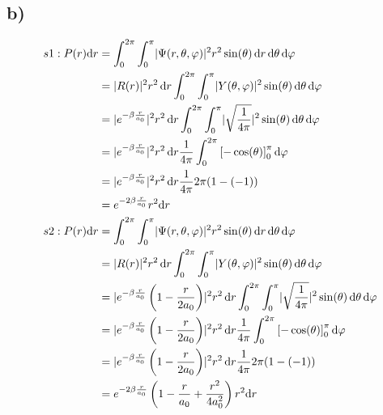     \subsection{b)}

    \begin{align*}
        s1: P(r)\mathrm{d}r &= \int_{0}^{2\pi} \int_{0}^{\pi} \lvert\Psi(r,\theta,\varphi)\rvert^2 r^2 \sin(\theta)\, \mathrm{d}r\, \mathrm{d}\theta\, \mathrm{d}\varphi\\
        &= \lvert R(r)\rvert^2 r^2 \,\mathrm{d}r \int_{0}^{2\pi} \int_{0}^{\pi} \lvert Y(\theta,\varphi)\rvert^2 \sin(\theta) \, \mathrm{d}\theta\, \mathrm{d}\varphi\\
        &= \lvert e^{-\beta\frac{r}{a_0}}\rvert^2 r^2 \,\mathrm{d}r \int_{0}^{2\pi} \int_{0}^{\pi} \lvert\sqrt{\frac{1}{4\pi}}\rvert^2 \sin(\theta) \, \mathrm{d}\theta\, \mathrm{d}\varphi\\
        &= \lvert e^{-\beta\frac{r}{a_0}}\rvert^2 r^2 \,\mathrm{d}r \frac{1}{4\pi} \int_{0}^{2\pi} \left[-\cos(\theta)\right]_0^{\pi} \mathrm{d}\varphi\\
        &= \lvert e^{-\beta\frac{r}{a_0}}\rvert^2 r^2 \,\mathrm{d}r \frac{1}{4\pi} 2\pi (1-(-1))\\
        &= e^{-2\beta\frac{r}{a_0}} r^2 \mathrm{d}r\\
        s2: P(r)\mathrm{d}r &= \int_{0}^{2\pi} \int_{0}^{\pi} \lvert\Psi(r,\theta,\varphi)\rvert^2 r^2 \sin(\theta)\, \mathrm{d}r\, \mathrm{d}\theta\, \mathrm{d}\varphi\\
        &= \lvert R(r)\rvert^2 r^2 \,\mathrm{d}r \int_{0}^{2\pi} \int_{0}^{\pi} \lvert Y(\theta,\varphi)\rvert^2 \sin(\theta) \, \mathrm{d}\theta\, \mathrm{d}\varphi\\
        &= \lvert e^{-\beta\frac{r}{a_0}}\left( 1-\frac{r}{2 a_0} \right)\rvert^2 r^2 \,\mathrm{d}r \int_{0}^{2\pi} \int_{0}^{\pi} \lvert\sqrt{\frac{1}{4\pi}}\rvert^2 \sin(\theta) \, \mathrm{d}\theta\, \mathrm{d}\varphi\\
        &= \lvert e^{-\beta\frac{r}{a_0}}\left( 1-\frac{r}{2 a_0} \right)\rvert^2 r^2 \,\mathrm{d}r \frac{1}{4\pi} \int_{0}^{2\pi} \left[-\cos(\theta)\right]_0^{\pi} \mathrm{d}\varphi\\
        &= \lvert e^{-\beta\frac{r}{a_0}}\left( 1-\frac{r}{2 a_0} \right)\rvert^2 r^2 \,\mathrm{d}r \frac{1}{4\pi} 2\pi (1-(-1))\\
        &= e^{-2\beta\frac{r}{a_0}}\left( 1-\frac{r}{a_0} +\frac{r^2}{4 a_0^2} \right) r^2 \mathrm{d}r
    \end{align*}

